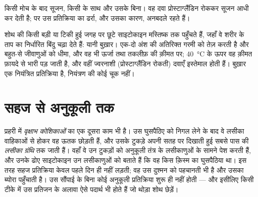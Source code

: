 \begin{omfigure}

{\small किसी मोच के बाद सूजन, किसी  के साथ और उसके बिना। वह दवा
प्रोस्टाग्लैंडिन रोककर सूजन आधी कर देती है; पर उस प्रतिक्रिया का ढर्रा, और
उसका कारण, अनबदले रहते हैं।}
\end{omfigure}

\begin{example}[बुख़ार]\label{ex:g12:innate-immunity:fever}
शोथ की किसी बड़ी या टिकी हुई जगह पर छूटे साइटोकाइन मस्तिष्क तक पहुँचते हैं,
जहाँ वे शरीर के ताप का निर्धारित बिंदु चढ़ा देते हैं: यानी बुख़ार। एक-दो
अंश की अतिरिक्त गरमी  को तेज़ करती है और बहुत-से जीवाणुओं को
धीमा, और वह भी ऊर्जा तथा तकलीफ़ की क़ीमत पर; \qty{40}{\celsius} के ऊपर वह
क़ीमत फ़ायदे से भारी पड़ जाती है, और वहीं ज्वरनाशी (प्रोस्टाग्लैंडिन रोकती)
दवाएँ इस्तेमाल होती हैं। बुख़ार एक नियंत्रित प्रतिक्रिया है, नियंत्रण की
कोई चूक नहीं।
\end{example}

\section{सहज से अनुकूली तक}

\begin{proposition}[वह सौंपाई]\label{prop:g12:innate-immunity:handover}
प्रहरी  में \emph{वृक्षाभ कोशिकाओं}
का एक दूसरा काम भी है। उस घुसपैठिए को निगल लेने के बाद वे लसीका वाहिकाओं से
होकर वह ऊतक छोड़ती हैं, और उसके  टुकड़े अपनी सतह पर दिखाती हुई सबसे
पास की \emph{लसीका ग्रंथि} तक जाती हैं। वहाँ वे उन टुकड़ों को अनुकूली तंत्र
के लसीकाणुओं के सामने पेश करती हैं, और उनके ढोए साइटोकाइन उन लसीकाणुओं को
बताते हैं कि वह किस क़िस्म का घुसपैठिया था। इस तरह सहज प्रतिक्रिया केवल पहले
दिन ही नहीं लड़ती; वह उस दुश्मन को पहचानती भी है और उसका ब्योरा पहुँचाती
है। उस सौंपाई के बिना कोई अनुकूली प्रतिक्रिया शुरू ही नहीं होती --- और
इसीलिए किसी टीके में उस प्रतिजन के अलावा ऐसे पदार्थ भी होते हैं जो थोड़ा
शोथ छेड़ें।
\end{proposition}
\admitted

